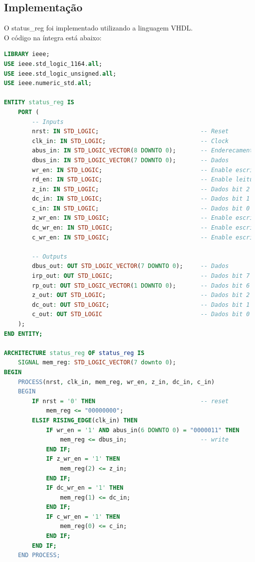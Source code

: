 \documentclass{article}
\begin{document}
\subsection{Implementação}

O status\_reg foi implementado utilizando a linguagem VHDL.\\

O código na íntegra está abaixo:\\

\begin{lstlisting}[language=VHDL, caption={Código VHDL status\_reg}]
LIBRARY ieee;
USE ieee.std_logic_1164.all;
USE ieee.std_logic_unsigned.all;
USE ieee.numeric_std.all;

ENTITY status_reg IS
    PORT (
        -- Inputs
        nrst: IN STD_LOGIC;                             -- Reset
        clk_in: IN STD_LOGIC;                           -- Clock
        abus_in: IN STD_LOGIC_VECTOR(8 DOWNTO 0);       -- Enderecamento
        dbus_in: IN STD_LOGIC_VECTOR(7 DOWNTO 0);       -- Dados
        wr_en: IN STD_LOGIC;                            -- Enable escrita
        rd_en: IN STD_LOGIC;                            -- Enable leitura
        z_in: IN STD_LOGIC;                             -- Dados bit 2
        dc_in: IN STD_LOGIC;                            -- Dados bit 1
        c_in: IN STD_LOGIC;                             -- Dados bit 0
        z_wr_en: IN STD_LOGIC;                          -- Enable escrita bit 2
        dc_wr_en: IN STD_LOGIC;                         -- Enable escrita bit 1
        c_wr_en: IN STD_LOGIC;                          -- Enable escrita bit 0

        -- Outputs
        dbus_out: OUT STD_LOGIC_VECTOR(7 DOWNTO 0);     -- Dados
        irp_out: OUT STD_LOGIC;                         -- Dados bit 7
        rp_out: OUT STD_LOGIC_VECTOR(1 DOWNTO 0);       -- Dados bit 6 e 5
        z_out: OUT STD_LOGIC;                           -- Dados bit 2
        dc_out: OUT STD_LOGIC;                          -- Dados bit 1
        c_out: OUT STD_LOGIC                            -- Dados bit 0
    );  
END ENTITY;

ARCHITECTURE status_reg OF status_reg IS
    SIGNAL mem_reg: STD_LOGIC_VECTOR(7 downto 0);
BEGIN
    PROCESS(nrst, clk_in, mem_reg, wr_en, z_in, dc_in, c_in)
    BEGIN
        IF nrst = '0' THEN                              -- reset
            mem_reg <= "00000000";
        ELSIF RISING_EDGE(clk_in) THEN
            IF wr_en = '1' AND abus_in(6 DOWNTO 0) = "0000011" THEN
                mem_reg <= dbus_in;                     -- write
            END IF;
            IF z_wr_en = '1' THEN
                mem_reg(2) <= z_in;                                     
            END IF;
            IF dc_wr_en = '1' THEN
                mem_reg(1) <= dc_in;
            END IF;
            IF c_wr_en = '1' THEN
                mem_reg(0) <= c_in;
            END IF;
        END IF;
    END PROCESS;
    

\end{lstlisting}
\end{document}
